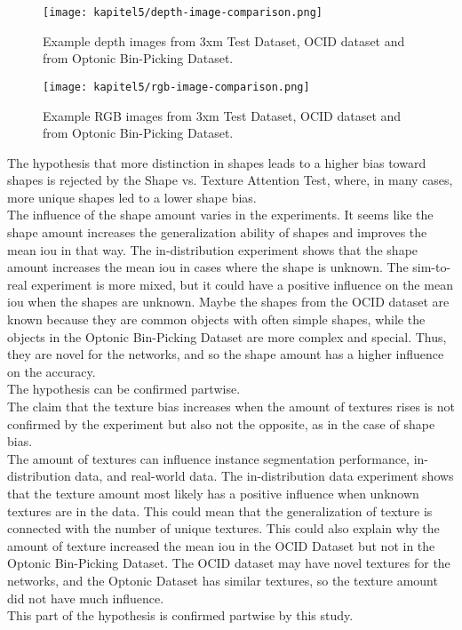 		\FloatBarrier
		\begin{figure}[h]
			\centering
			\texttt{[image: kapitel5/depth-image-comparison.png]}
			\caption[Example depth images from 3xm Test Dataset, OCID dataset and from Optonic Bin-Picking Dataset.]{Example depth images from 3xm Test Dataset, OCID dataset and from Optonic Bin-Picking Dataset.}
			\label{img:depth-image-comparison}
		\end{figure}
		
		\begin{figure}[h]
			\centering
			\texttt{[image: kapitel5/rgb-image-comparison.png]}
			\caption[Example RGB images from 3xm Test Dataset, OCID dataset and from Optonic Bin-Picking Dataset.]{Example RGB images from 3xm Test Dataset, OCID dataset and from Optonic Bin-Picking Dataset.}
			\label{img:rgb-image-comparison}
		\end{figure}
		\FloatBarrier
		
		The hypothesis that more distinction in shapes leads to a higher bias toward shapes is rejected by the Shape vs. Texture Attention Test, where, in many cases, more unique shapes led to a lower shape bias.\\
		The influence of the shape amount varies in the experiments. It seems like the shape amount increases the generalization ability of shapes and improves the mean \ac{iou} in that way. The in-distribution experiment shows that the shape amount increases the mean \ac{iou} in cases where the shape is unknown. The sim-to-real experiment is more mixed, but it could have a positive influence on the mean \ac{iou} when the shapes are unknown. Maybe the shapes from the OCID dataset are known because they are common objects with often simple shapes, while the objects in the Optonic Bin-Picking Dataset are more complex and special. Thus, they are novel for the networks, and so the shape amount has a higher influence on the accuracy.\\
		The hypothesis can be confirmed partwise.\\
		The claim that the texture bias increases when the amount of textures rises is not confirmed by the experiment but also not the opposite, as in the case of shape bias.\\
		The amount of textures can influence instance segmentation performance, in-distribution data, and real-world data. The in-distribution data experiment shows that the texture amount most likely has a positive influence when unknown textures are in the data. This could mean that the generalization of texture is connected with the number of unique textures. This could also explain why the amount of texture increased the mean \ac{iou} in the OCID Dataset but not in the Optonic Bin-Picking Dataset. The OCID dataset may have novel textures for the networks, and the Optonic Dataset has similar textures, so the texture amount did not have much influence.\\
		This part of the hypothesis is confirmed partwise by this study.
		
